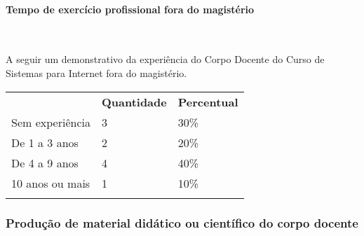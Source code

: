 \paragraph{Tempo de exercício profissional fora do magistério}\

A seguir um demonstrativo da experiência do Corpo Docente do Curso de Sistemas para Internet fora do magistério.

\begin{table}[h!]
\begin{tabular}{lll}
\rowcolor[HTML]{C0C0C0} 
\multicolumn{1}{c}{\cellcolor[HTML]{C0C0C0}\textbf{Experiência Profissional Fora do Magistério}} & \multicolumn{1}{c}{\cellcolor[HTML]{C0C0C0}\textbf{Quantidade}} & \multicolumn{1}{c}{\cellcolor[HTML]{C0C0C0}\textbf{Percentual}} \\
Sem experiência                                                                                  & 3                                                               & 30\%                                                            \\
De 1 a 3 anos                                                                                    & 2                                                               & 20\%                                                            \\
De 4 a 9 anos                                                                                    & 4                                                               & 40\%                                                            \\
10 anos ou mais                                                                                  & 1                                                               & 10\%                                                            \\
\rowcolor[HTML]{9B9B9B} 
\multicolumn{3}{l}{\cellcolor[HTML]{9B9B9B}}                                                                                                                                                                                        
\end{tabular}
\end{table}

\subsubsection{Produção de material didático ou científico do corpo docente}

